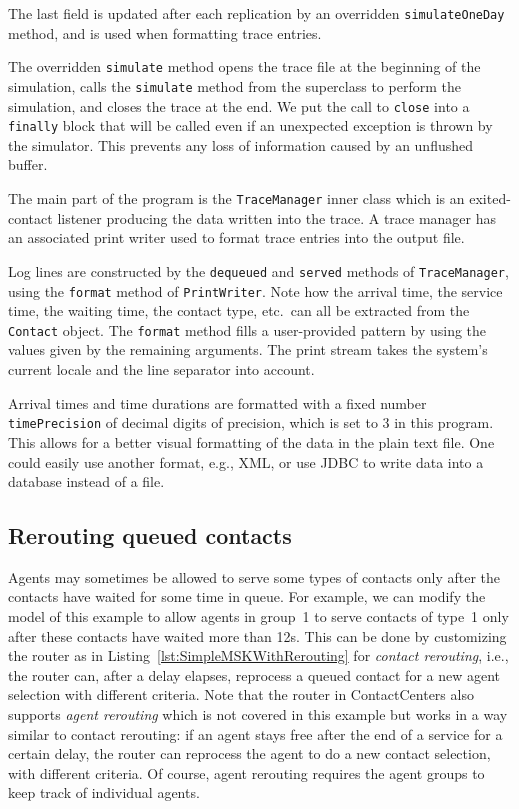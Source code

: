 The last field is updated after each replication by an overridden
\texttt{simulate\-One\-Day} method, and is used when formatting trace
entries.

The overridden \texttt{simulate} method opens the trace file at
the beginning of the simulation, calls the \texttt{simulate} method
from the superclass to
perform the simulation, and closes the trace at the end.
We put the call to \texttt{close} into a
\texttt{finally} block that will be called even if an unexpected
exception is thrown by the simulator.
This prevents any loss of information caused by an unflushed buffer.

The main part of the program is the
\texttt{Trace\-Manager} inner class which is an exited-contact listener
producing the data written into the trace.
A trace manager has an associated print writer used to format trace
entries into the output file.

Log lines are constructed by the \texttt{dequeued} and \texttt{served}
methods of \texttt{Trace\-Manager}, using the \texttt{format} method
of \texttt{Print\-Writer}.
Note how the arrival time, the service time, the waiting time, the
contact type, etc.\ can all be extracted from the \texttt{Contact}
object.
The \texttt{format} method fills a user-provided pattern
by using the values given by the remaining arguments.  The print stream
takes the system's current locale and the line separator into account.

Arrival times and time durations are formatted with a fixed
number \texttt{timePrecision} of decimal digits of precision, which is
set to 3 in this program.
This allows for a better visual formatting of the data in the plain
text file.
One could easily use another format, e.g., XML, or use JDBC to
write data into a database instead of a file.

\subsection{Rerouting queued contacts}

Agents may sometimes be allowed to serve some types of contacts only
after the contacts have waited for some time in queue.
For example, we can modify the model of this example to allow agents
in group~1 to serve contacts of type~1 only after these contacts have
waited more than 12s.
This can be done by customizing the router as in
Listing~\ref{lst:SimpleMSKWithRerouting} for \emph{contact rerouting},
i.e., the router can, after a delay elapses, reprocess a queued
contact for a new agent selection with different criteria.
Note that the router in ContactCenters also supports \emph{agent
  rerouting} which is not covered in this example but
works in a way similar to contact rerouting:
if an agent stays free after the end of a service for a certain delay,
the router can reprocess the agent to do a new contact selection, with
different criteria.
Of course, agent rerouting requires the agent groups to keep track of
individual agents.

